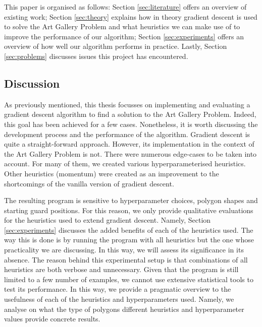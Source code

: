 This paper is organised as follows: Section \ref{sec:literature} offers an overview of existing work; Section \ref{sec:theory} explains how in theory gradient descent is used to solve the Art Gallery Problem and what heuristics we can make use of to improve the performance of our algorithm; Section \ref{sec:experiments} offers an overview of how well our algorithm performs in practice. Lastly, Section \ref{sec:problems} discusses issues this project has encountered.

\subsection{Discussion}
As previously mentioned, this thesis focusses on implementing and evaluating a gradient descent algorithm to find a solution to the Art Gallery Problem. Indeed, this goal has been achieved for a few cases. 
Nonetheless, it is worth discussing the development process and the performance of the algorithm. Gradient descent is quite a straight-forward approach. However, its implementation in the context of the Art Gallery Problem is not. There were numerous edge-cases to be taken into account. For many of them, we created various hyperparameterised heuristics. Other heuristics (momentum) were created as an improvement to the shortcomings of the vanilla version of gradient descent.

The resulting program is sensitive to hyperparameter choices, polygon shapes and starting guard positions. For this reason, we only provide qualitative evaluations for the heuristics used to extend gradient descent. Namely, Section \ref{sec:experiments} discusses the added benefits of each of the heuristics used. The way this is done is by running the program with all heuristics but the one whose practicality we are discussing. In this way, we will assess its significance in its absence. The reason behind this experimental setup is that combinations of all heuristics are both verbose and unnecessary. Given that the program is still limited to a few number of examples, we cannot use extensive statistical tools to test its performance.
In this way, we provide a pragmatic overview to the usefulness of each of the heuristics and hyperparameters used. Namely, we analyse on what the type of polygons different heuristics and hyperparameter values provide concrete results.

